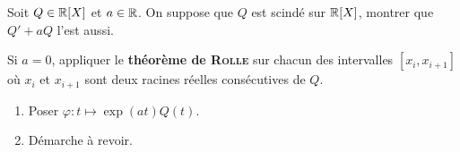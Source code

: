 \begin{box_enonce}
    Soit $Q \in \mathbb{R}[X]$ et $a \in \mathbb{R}$. On suppose que $Q$ est scindé sur $\mathbb{R}[X]$, montrer que $Q'+aQ$ l'est aussi. 
\end{box_enonce}
Si $a=0$, appliquer le \textbf{théorème de \textsc{Rolle}} sur chacun des intervalles $[x_i, x_{i+1}]$ où $x_i$ et $x_{i+1}$ sont deux racines réelles consécutives de $Q$.
\begin{enumerate} 
    \item Poser $\varphi:t \mapsto \exp(at)Q(t)$.
    \item Démarche à revoir.
\end{enumerate}